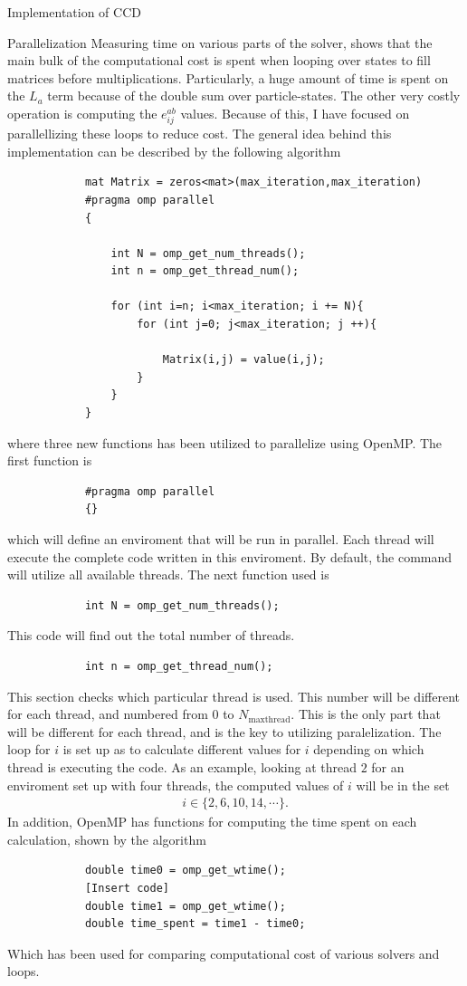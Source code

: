\documentclass[twoside,english]{uiofysmaster}
\begin{document}
\begin{chapter}{Implementation of CCD}
\begin{section}{Parallelization}
		Measuring time on various parts of the solver, shows that the main bulk of the computational cost is spent when looping over states to fill matrices before multiplications. Particularly, a huge amount of time is spent on the $L_a$ term because of the double sum over particle-states. The other very costly operation is computing the $e_{ij}^{ab}$ values. Because of this, I have focused on parallellizing these loops to reduce cost. The general idea behind this implementation can be described by the following algorithm
		\begin{lstlisting}
			mat Matrix = zeros<mat>(max_iteration,max_iteration)
			#pragma omp parallel
			{

				int N = omp_get_num_threads();
				int n = omp_get_thread_num();

				for (int i=n; i<max_iteration; i += N){
					for (int j=0; j<max_iteration; j ++){

						Matrix(i,j) = value(i,j);
					}
				}
			}
		\end{lstlisting}
		where three new functions has been utilized to
                parallelize using OpenMP. The first function is
		\begin{lstlisting}
			#pragma omp parallel
			{}
		\end{lstlisting}
		which will define an enviroment that will be run in
                parallel. Each thread will execute the complete code
                written in this enviroment. By default, the command
                will utilize all available threads. The next function
                used is
		\begin{lstlisting}
			int N = omp_get_num_threads();
		\end{lstlisting}
		This code will find out the total number of threads. 
		\begin{lstlisting}
			int n = omp_get_thread_num();
		\end{lstlisting}
		This section checks which particular thread is
                used. This number will be different for each thread,
                and numbered from $0$ to $N_{\text{maxthread}}$. This
                is the only part that will be different for each
                thread, and is the key to utilizing
                paralelization. The loop for $i$ is set up as to
                calculate different values for $i$ depending on which
                thread is executing the code. As an example, looking
                at thread $2$ for an enviroment set up with four
                threads, the computed values of $i$ will be in the set
		\begin{align}
			i \in \{2, 6, 10, 14, \cdots \}.
		\end{align}
		In addition, OpenMP has functions for computing the time spent on each calculation, shown by the algorithm
		\begin{lstlisting}
			double time0 = omp_get_wtime();
			[Insert code]
			double time1 = omp_get_wtime();
			double time_spent = time1 - time0;
		\end{lstlisting}
		Which has been used for comparing computational cost of various solvers and loops.
	\end{section}


\end{chapter}
\end{document}
